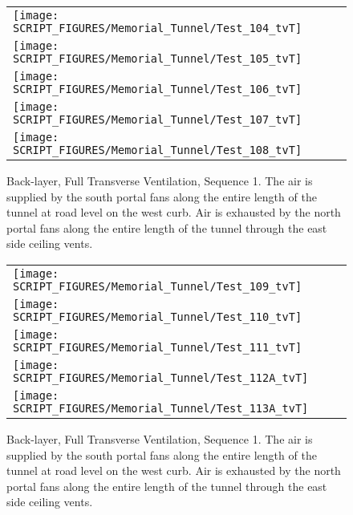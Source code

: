 \begin{figure}[p]
\begin{tabular*}{\textwidth}{l}
\texttt{[image: SCRIPT\_FIGURES/Memorial\_Tunnel/Test\_104\_tvT]} \\
\texttt{[image: SCRIPT\_FIGURES/Memorial\_Tunnel/Test\_105\_tvT]} \\
\texttt{[image: SCRIPT\_FIGURES/Memorial\_Tunnel/Test\_106\_tvT]} \\
\texttt{[image: SCRIPT\_FIGURES/Memorial\_Tunnel/Test\_107\_tvT]} \\
\texttt{[image: SCRIPT\_FIGURES/Memorial\_Tunnel/Test\_108\_tvT]}
\end{tabular*}
\caption[Back-layer, Full Transverse Ventilation, Sequence 1]{Back-layer, Full Transverse Ventilation, Sequence 1. The air is supplied by the south portal fans along the entire length of the tunnel at road level on the west curb. Air is exhausted by the north portal fans along the entire length of the tunnel through the east side ceiling vents.}
\label{Memorial_Tunnel_Seq_1b}
\end{figure}

\begin{figure}[p]
\begin{tabular*}{\textwidth}{l}
\texttt{[image: SCRIPT\_FIGURES/Memorial\_Tunnel/Test\_109\_tvT]} \\
\texttt{[image: SCRIPT\_FIGURES/Memorial\_Tunnel/Test\_110\_tvT]} \\
\texttt{[image: SCRIPT\_FIGURES/Memorial\_Tunnel/Test\_111\_tvT]} \\
\texttt{[image: SCRIPT\_FIGURES/Memorial\_Tunnel/Test\_112A\_tvT]} \\
\texttt{[image: SCRIPT\_FIGURES/Memorial\_Tunnel/Test\_113A\_tvT]}
\end{tabular*}
\caption[Back-layer, Full Transverse Ventilation, Sequence 1]{Back-layer, Full Transverse Ventilation, Sequence 1. The air is supplied by the south portal fans along the entire length of the tunnel at road level on the west curb. Air is exhausted by the north portal fans along the entire length of the tunnel through the east side ceiling vents.}
\label{Memorial_Tunnel_Seq_1c}
\end{figure}

